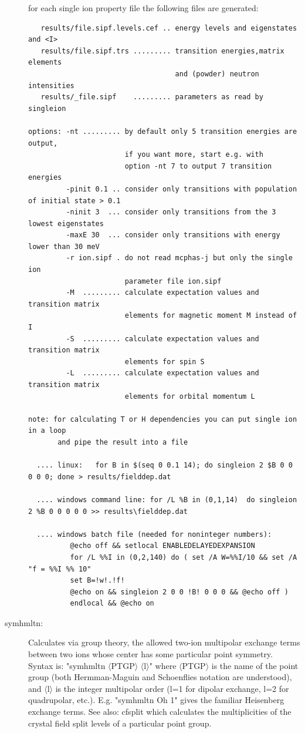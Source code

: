 \begin{description}
for each single ion property file the following files are generated:
\begin{verbatim}
   results/file.sipf.levels.cef .. energy levels and eigenstates and <I>
   results/file.sipf.trs ......... transition energies,matrix elements
                                   and (powder) neutron intensities
   results/_file.sipf    ......... parameters as read by singleion

options: -nt ......... by default only 5 transition energies are output,
                       if you want more, start e.g. with 
                       option -nt 7 to output 7 transition energies
         -pinit 0.1 .. consider only transitions with population of initial state > 0.1
         -ninit 3  ... consider only transitions from the 3 lowest eigenstates
         -maxE 30  ... consider only transitions with energy lower than 30 meV
         -r ion.sipf . do not read mcphas-j but only the single ion
                       parameter file ion.sipf
         -M  ......... calculate expectation values and transition matrix
                       elements for magnetic moment M instead of I
         -S  ......... calculate expectation values and transition matrix
                       elements for spin S
         -L  ......... calculate expectation values and transition matrix
                       elements for orbital momentum L

note: for calculating T or H dependencies you can put single ion in a loop
       and pipe the result into a file

  .... linux:   for B in $(seq 0 0.1 14); do singleion 2 $B 0 0 0 0 0; done > results/fielddep.dat

  .... windows command line: for /L %B in (0,1,14)  do singleion 2 %B 0 0 0 0 0 >> results\fielddep.dat

  .... windows batch file (needed for noninteger numbers):
          @echo off && setlocal ENABLEDELAYEDEXPANSION
          for /L %%I in (0,2,140) do ( set /A W=%%I/10 && set /A "f = %%I %% 10"
          set B=!w!.!f!
          @echo on && singleion 2 0 0 !B! 0 0 0 && @echo off )
          endlocal && @echo on 
\end{verbatim}      

\item [\prg symhmltn:] Calculates via group theory, the allowed two-ion multipolar exchange terms
between two ions whose center has some particular point symmetry. Syntax is: 
"{\prg symhmltn $\langle$PTGP$\rangle$ $\langle$l$\rangle$}" where {\prg $\langle$PTGP$\rangle$} is 
the name of the point group (both Hermman-Maguin and Schoenflies notation are understood), and 
{\prg $\langle$l$\rangle$} is the integer multipolar order (l=1 for dipolar exchange, l=2 for 
quadrupolar, etc.).
E.g. "{\prg symhmltn Oh 1}" gives the familiar Heisenberg exchange terms. 
See also: {\prg cfsplit} which calculates the multiplicities of the crystal field split levels of a
particular point group.

\end{description} 

